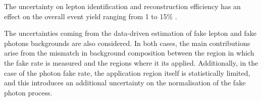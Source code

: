 The uncertainty on lepton identification and reconstruction efficiency has an effect on the overall event yield ranging from 1 to 15\usep\% .

The uncertainties coming from the data-driven estimation of fake lepton and fake photons backgrounds are also considered.
In both cases, the main contributions arise from the mismatch in background composition between the region in which the fake rate is measured and the regions where it its applied.
Additionally, in the case of the photon fake rate, the application region itself is statistically limited, and this introduces an additional uncertainty on the normalisation of the fake photon process.
